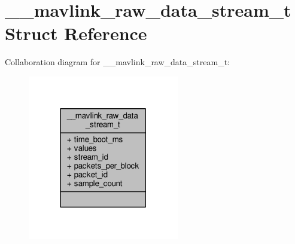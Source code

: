 \hypertarget{struct____mavlink__raw__data__stream__t}{\section{\+\_\+\+\_\+mavlink\+\_\+raw\+\_\+data\+\_\+stream\+\_\+t Struct Reference}
\label{struct____mavlink__raw__data__stream__t}
}


Collaboration diagram for \+\_\+\+\_\+mavlink\+\_\+raw\+\_\+data\+\_\+stream\+\_\+t\+:
\nopagebreak
\begin{figure}[H]
\begin{center}
\leavevmode
\includegraphics[width=187pt]{struct____mavlink__raw__data__stream__t__coll__graph}
\end{center}
\end{figure}
